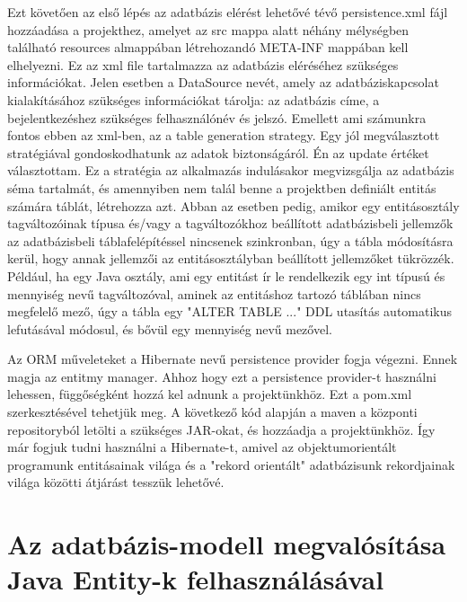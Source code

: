 \documentclass[centeredchapter]{thesis-ekf}
\theoremstyle{definition}
\theoremstyle{remark}
\begin{document}
Ezt követően az első lépés az adatbázis elérést lehetővé tévő persistence.xml fájl hozzáadása a projekthez, amelyet az src mappa alatt néhány mélységben található resources almappában létrehozandó META-INF mappában kell elhelyezni. Ez az xml file tartalmazza az adatbázis eléréséhez szükséges információkat. Jelen esetben a DataSource nevét, amely az adatbáziskapcsolat kialakításához szükséges információkat tárolja: az adatbázis címe, a bejelentkezéshez szükséges felhasználónév és jelszó.
Emellett ami számunkra fontos ebben az xml-ben, az a table generation strategy. Egy jól megválasztott stratégiával gondoskodhatunk az adatok biztonságáról. Én az update értéket választottam. Ez a stratégia az alkalmazás indulásakor megvizsgálja az adatbázis séma tartalmát, és amennyiben nem talál benne a projektben definiált entitás számára táblát, létrehozza azt. Abban az esetben pedig, amikor egy entitásosztály tagváltozóinak típusa és/vagy a tagváltozókhoz beállított adatbázisbeli jellemzők az adatbázisbeli táblafelépítéssel nincsenek szinkronban, úgy a tábla módosításra kerül, hogy annak jellemzői az entitásosztályban beállított jellemzőket tükrözzék.
Például, ha egy Java osztály, ami egy entitást ír le rendelkezik egy int típusú és mennyiség nevű tagváltozóval, aminek az entitáshoz tartozó táblában nincs megfelelő mező, úgy a tábla egy "ALTER TABLE ..." DDL utasítás automatikus lefutásával módosul, és bővül egy mennyiség nevű mezővel. 

Az ORM műveleteket a Hibernate nevű persistence provider fogja végezni. Ennek magja az entitmy manager. Ahhoz hogy ezt a persistence provider-t használni lehessen, függőségként hozzá kel adnunk a projektünkhöz. Ezt a pom.xml szerkesztésével tehetjük meg. A \hypertarget{figure-hibernate-dependencies}{következő} kód alapján a maven a központi repositoryból letölti a szükséges JAR-okat, és hozzáadja a projektünkhöz. Így már fogjuk tudni használni a Hibernate-t, amivel az objektumorientált programunk entitásainak világa és a "rekord orientált" adatbázisunk rekordjainak világa közötti átjárást tesszük lehetővé.

\newpage
\hypertarget{figure-hibarnate-dependencies}{}




\newpage
\section{Az adatbázis-modell megvalósítása Java Entity-k felhasználásával}
\end{document}
